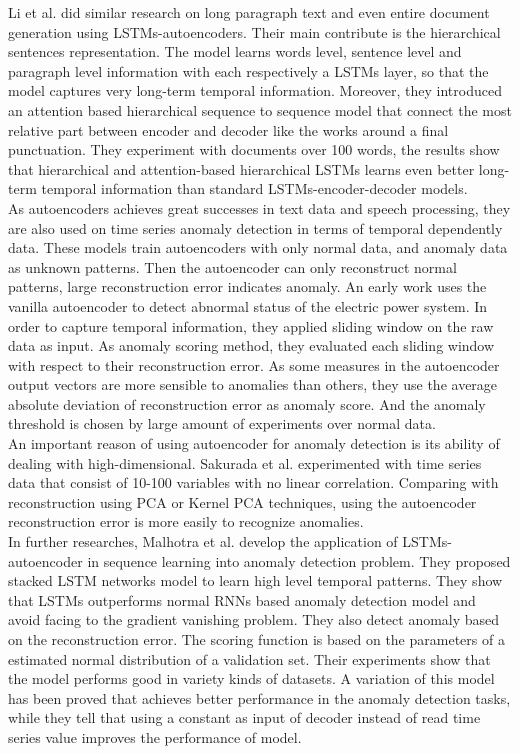 Li et al. \cite{hierarchicalseq2seq} did similar research on long paragraph text and even entire document generation using LSTMs-autoencoders. Their main contribute is the hierarchical sentences representation. The model learns words level, sentence level and paragraph level information with each respectively a LSTMs layer, so that the model captures very long-term temporal information. Moreover, they introduced an attention based hierarchical sequence to sequence model that connect the most relative part between encoder and decoder like the works around a final punctuation. They experiment with documents over 100 words, the results show that hierarchical and attention-based hierarchical LSTMs learns even better long-term temporal information than standard LSTMs-encoder-decoder models.\\

As autoencoders achieves great successes in text data and speech processing, they are also used on time series anomaly detection in terms of temporal dependently data. These models train autoencoders with only normal data, and anomaly data as unknown patterns. Then the autoencoder can only reconstruct normal patterns, large reconstruction error indicates anomaly. An early work \cite{eps} uses the vanilla autoencoder to detect abnormal status of the electric power system. In order to capture temporal information, they applied sliding window on the raw data as input. As anomaly scoring method, they evaluated each sliding window with respect to their reconstruction error. As some measures in the autoencoder output vectors are more sensible to anomalies than others, they use the average absolute deviation of reconstruction error as anomaly score. And the anomaly threshold is chosen by large amount of experiments over normal data.\\

An important reason of using autoencoder for anomaly detection is its ability of dealing with high-dimensional. Sakurada et al. \cite{ dimensionalityreduction} experimented with time series data that consist of 10-100 variables with no linear correlation. Comparing with reconstruction using PCA or Kernel PCA techniques, using the autoencoder reconstruction error is more easily to recognize anomalies.\\

In further researches, Malhotra et al. \cite{lstmad}\cite{encdecad} develop the application of LSTMs-autoencoder in sequence learning into anomaly detection problem. They proposed stacked LSTM networks model to learn high level temporal patterns. They show that LSTMs outperforms normal RNNs based anomaly detection model and avoid facing to the gradient vanishing problem. They also detect anomaly based on the reconstruction error. The scoring function is based on the parameters of a estimated normal distribution of a validation set. Their experiments show that the model performs good in variety kinds of datasets. A variation of this model \cite{timenet} has been proved that achieves better performance in the anomaly detection tasks, while they tell that using a constant as input of decoder instead of read time series value improves the performance of model.


